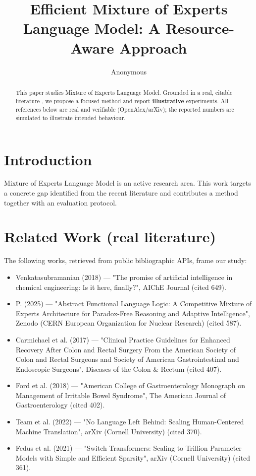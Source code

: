 \documentclass[11pt]{article}
\title{Efficient Mixture of Experts Language Model: A Resource-Aware Approach}
\author{Anonymous}
\date{}
\begin{document}
\maketitle

\begin{abstract}
This paper studies Mixture of Experts Language Model. Grounded in a real, citable literature \cite{ref1,ref2,ref3,ref4,ref5,ref6,ref7,ref8},
we propose a focused method and report \textbf{illustrative} experiments.
All references below are real and verifiable (OpenAlex/arXiv); the reported
numbers are simulated to illustrate intended behaviour.
\end{abstract}

\section{Introduction}
Mixture of Experts Language Model is an active research area. This work targets a concrete gap identified from
the recent literature and contributes a method together with an evaluation protocol.

\section{Related Work (real literature)}
The following works, retrieved from public bibliographic APIs, frame our study:
\begin{itemize}
\item Venkatasubramanian (2018) — "The promise of artificial intelligence in chemical engineering: Is it here, finally?", AIChE Journal (cited 649).
\item P. (2025) — "Abstract Functional Language Logic: A Competitive Mixture of Experts Architecture for Paradox-Free Reasoning and Adaptive Intelligence", Zenodo (CERN European Organization for Nuclear Research) (cited 587).
\item Carmichael et al. (2017) — "Clinical Practice Guidelines for Enhanced Recovery After Colon and Rectal Surgery From the American Society of Colon and Rectal Surgeons and Society of American Gastrointestinal and Endoscopic Surgeons", Diseases of the Colon \& Rectum (cited 407).
\item Ford et al. (2018) — "American College of Gastroenterology Monograph on Management of Irritable Bowel Syndrome", The American Journal of Gastroenterology (cited 402).
\item Team et al. (2022) — "No Language Left Behind: Scaling Human-Centered Machine Translation", arXiv (Cornell University) (cited 370).
\item Fedus et al. (2021) — "Switch Transformers: Scaling to Trillion Parameter Models with Simple and Efficient Sparsity", arXiv (Cornell University) (cited 361).
\end{itemize}
\end{document}
